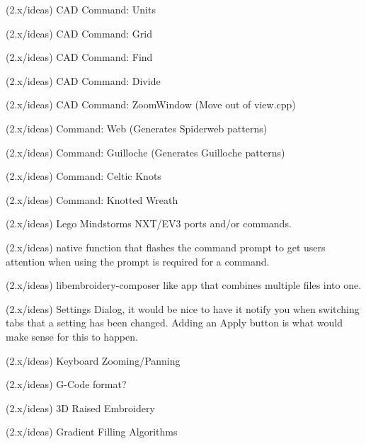 \begin{DoxyRefList}
\label{todo__todo000310}%
%
(2.\+x/ideas) CAD Command\+: Units

\label{todo__todo000311}%
%
(2.\+x/ideas) CAD Command\+: Grid

\label{todo__todo000312}%
%
(2.\+x/ideas) CAD Command\+: Find

\label{todo__todo000313}%
%
(2.\+x/ideas) CAD Command\+: Divide

\label{todo__todo000314}%
%
(2.\+x/ideas) CAD Command\+: Zoom\+Window (Move out of view.\+cpp)

\label{todo__todo000315}%
%
(2.\+x/ideas) Command\+: Web (Generates Spiderweb patterns)

\label{todo__todo000316}%
%
(2.\+x/ideas) Command\+: Guilloche (Generates Guilloche patterns)

\label{todo__todo000317}%
%
(2.\+x/ideas) Command\+: Celtic Knots

\label{todo__todo000318}%
%
(2.\+x/ideas) Command\+: Knotted Wreath

\label{todo__todo000319}%
%
(2.\+x/ideas) Lego Mindstorms NXT/\+EV3 ports and/or commands.

\label{todo__todo000320}%
%
(2.\+x/ideas) native function that flashes the command prompt to get users attention when using the prompt is required for a command.

\label{todo__todo000321}%
%
(2.\+x/ideas) libembroidery-\/composer like app that combines multiple files into one.

\label{todo__todo000322}%
%
(2.\+x/ideas) Settings Dialog, it would be nice to have it notify you when switching tabs that a setting has been changed. Adding an Apply button is what would make sense for this to happen. 

\label{todo__todo000323}%
%
(2.\+x/ideas) Keyboard Zooming/\+Panning

\label{todo__todo000324}%
%
(2.\+x/ideas) G-\/\+Code format?

\label{todo__todo000325}%
%
(2.\+x/ideas) 3D Raised Embroidery

\label{todo__todo000326}%
%
(2.\+x/ideas) Gradient Filling Algorithms


\end{DoxyRefList}
